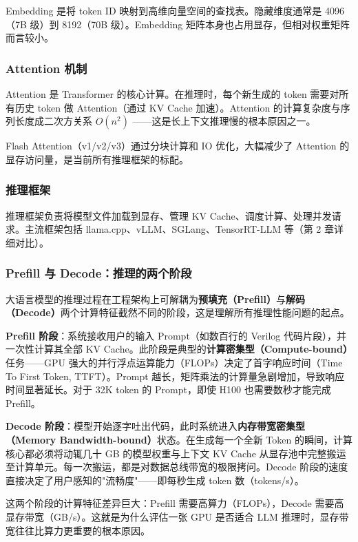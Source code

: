 \documentclass[UTF8,a4paper,10pt,oneside]{ctexart}
\begin{document}
Embedding 是将 token ID 映射到高维向量空间的查找表。隐藏维度通常是 4096（7B 级）到 8192（70B 级）。Embedding 矩阵本身也占用显存，但相对权重矩阵而言较小。

\subsubsection{Attention 机制}

Attention 是 Transformer 的核心计算。在推理时，每个新生成的 token 需要对所有历史 token 做 Attention（通过 KV Cache 加速）。Attention 的计算复杂度与序列长度成二次方关系 $O(n^2)$ ——这是长上下文推理慢的根本原因之一。

Flash Attention（v1/v2/v3）通过分块计算和 IO 优化，大幅减少了 Attention 的显存访问量，是当前所有推理框架的标配。

\subsubsection{推理框架}

推理框架负责将模型文件加载到显存、管理 KV Cache、调度计算、处理并发请求。主流框架包括 llama.cpp、vLLM、SGLang、TensorRT-LLM 等（第 2 章详细对比）。

\subsubsection{Prefill 与 Decode：推理的两个阶段}

大语言模型的推理过程在工程架构上可解耦为\textbf{预填充（Prefill）}与\textbf{解码（Decode）}两个计算特征截然不同的阶段，这是理解所有推理性能问题的起点。

\textbf{Prefill 阶段}：系统接收用户的输入 Prompt（如数百行的 Verilog 代码片段），并一次性计算其全部 KV Cache。此阶段是典型的\textbf{计算密集型（Compute-bound）}任务——GPU 强大的并行浮点运算能力（FLOPs）决定了首字响应时间（Time To First Token, TTFT）。Prompt 越长，矩阵乘法的计算量急剧增加，导致响应时间显著延长。对于 32K token 的 Prompt，即使 H100 也需要数秒才能完成 Prefill。

\textbf{Decode 阶段}：模型开始逐字吐出代码，此时系统进入\textbf{内存带宽密集型（Memory Bandwidth-bound）}状态。在生成每一个全新 Token 的瞬间，计算核心都必须将动辄几十 GB 的模型权重与上下文 KV Cache 从显存池中完整搬运至计算单元。每一次搬运，都是对数据总线带宽的极限拷问。Decode 阶段的速度直接决定了用户感知的"流畅度"——即每秒生成 token 数（tokens/s）。

这两个阶段的计算特征差异巨大：Prefill 需要高算力（FLOPs），Decode 需要高显存带宽（GB/s）。这就是为什么评估一张 GPU 是否适合 LLM 推理时，显存带宽往往比算力更重要的根本原因。
\end{document}
